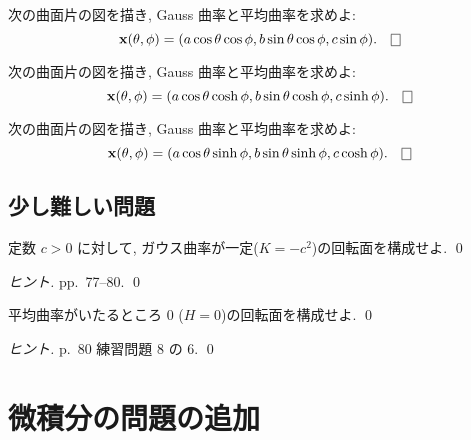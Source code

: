 \documentclass[12pt,twoside]{jarticle}
\begin{document}
\begin{question}[楕円面]
  次の曲面片の図を描き, Gauss 曲率と平均曲率を求めよ:
  \begin{equation*}
    \x(\theta,\phi)
    =(a\cos\theta\cos\phi,b\sin\theta\cos\phi,c\sin\phi).
    \qed
  \end{equation*}
\end{question}

\begin{question}[一葉双曲面]
  次の曲面片の図を描き, Gauss 曲率と平均曲率を求めよ:
  \begin{equation*}
    \x(\theta,\phi)
    =(a\cos\theta\cosh\phi,b\sin\theta\cosh\phi,c\sinh\phi).
    \qed
  \end{equation*}
\end{question}

\begin{question}[二葉双曲面]
  次の曲面片の図を描き, Gauss 曲率と平均曲率を求めよ:
  \begin{equation*}
    \x(\theta,\phi)
    =(a\cos\theta\sinh\phi,b\sin\theta\sinh\phi,c\cosh\phi).
    \qed
  \end{equation*}
\end{question}


\subsection{少し難しい問題}

\begin{question}
  定数 $c>0$ に対して, ガウス曲率が一定($K=-c^2$)の回転面を構成せよ. \qed
\end{question}

\begin{proof}[ヒント]
  \cite{UY} pp.~77--80. \qed
\end{proof}

\begin{question}
  平均曲率がいたるところ $0$ ($H=0$)の回転面を構成せよ. \qed
\end{question}

\begin{proof}[ヒント]
  \cite{UY} p.~80 練習問題 8 の 6. \qed
\end{proof}


\section{微積分の問題の追加}
\end{document}
